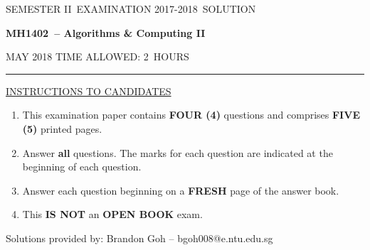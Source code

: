 \documentclass[12pt]{article}
\newcommand{\masunitnumber}{MH1402}
\newcommand{\examdate}{MAY 2018}
\newcommand{\academicyear}{2017-2018}
\newcommand{\semester}{II}
\newcommand{\coursename}{Algorithms \& Computing II}
\newcommand{\numberofhours}{2}
\begin{document}
\setlength{\headsep}{5truemm}
\setlength{\headheight}{14.5truemm}
\setlength{\voffset}{-0.45truein}
\renewcommand{\headrulewidth}{0.0pt}
\begin{center}
SEMESTER \semester\ EXAMINATION \academicyear ~SOLUTION
\end{center}
\begin{center}
{\bf \masunitnumber\ -- \coursename}
\end{center}
\vspace{20truemm}

\noindent \examdate\hspace{55truemm} TIME ALLOWED: \numberofhours\ HOURS

\vspace{19truemm}
\hrule
\vspace{19truemm}
\noindent\underline{INSTRUCTIONS TO CANDIDATES}
\vspace{8truemm}
\begin{enumerate}
\item This examination paper contains {\bf FOUR (4)} questions and comprises 
{\bf FIVE (5)} printed pages.

\item Answer \textbf{all} questions. 
The marks for each question are indicated at the beginning of each question.


\item Answer each question beginning on a {\bf FRESH} page of the answer book.

\item This {\bf IS NOT} an {\bf OPEN BOOK} exam.

\end{enumerate}

\newpage
\lhead{}
\rhead{\masunitnumber}
\chead{}
\lfoot{}
\cfoot{\thepage}
\rfoot{}
\setlength{\footskip}{45pt}
\noindent Solutions provided by:
Brandon Goh -- bgoh008@e.ntu.edu.sg
\end{document}
